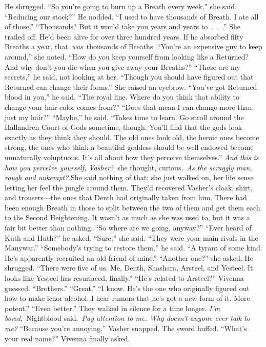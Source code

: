 He shrugged.
“So you’re going to burn up a Breath every week,” she said. “Reducing our stock?”
He nodded. “I used to have thousands of Breath. I ate all of those.”
“Thousands? But it would take you years and years to~.~.~.” She trailed off. He’d been alive for over three hundred years. If he absorbed fifty Breaths a year, that~\textit{was}~thousands of Breaths. “You’re an expensive guy to keep around,” she noted. “How do you keep yourself from looking like a Returned? And why don’t you die when you give away your Breaths?”
“Those are my secrets,” he said, not looking at her. “Though you should have figured out that Returned can change their forms.”
She raised an eyebrow.
“You’ve got Returned blood in you,” he said. “The royal line. Where do you think that ability to change your hair color comes from?”
“Does that mean I can change more than just my hair?”
“Maybe,” he said. “Takes time to learn. Go stroll around the Hallandren Court of Gods sometime, though. You’ll find that the gods look exactly as they think they should. The old ones look old, the heroic ones become strong, the ones who think a beautiful goddess should be well endowed become unnaturally voluptuous. It’s all about how they perceive themselves.”
\textit{And this is how you perceive yourself, Vasher?}~she thought, curious.~\textit{As the scraggly man, rough and unkempt?}
She said nothing of that; she just walked on, her life sense letting her feel the jungle around them. They’d recovered Vasher’s cloak, shirt, and trousers—the ones that Denth had originally taken from him. There had been enough Breath in those to split between the two of them and get them each to the Second Heightening. It wasn’t as much as she was used to, but it was a fair bit better than nothing.
“So where are we going, anyway?”
“Ever heard of Kuth and Huth?” he asked.
“Sure,” she said. “They were your main rivals in the Manywar.”
“Somebody’s trying to restore them,” he said. “A tyrant of some kind. He’s apparently recruited an old friend of mine.”
“Another one?” she asked.
He shrugged. “There were five of us. Me, Denth, Shashara, Arsteel, and Yesteel. It looks like Yesteel has resurfaced, finally.”
“He’s related to Arsteel?” Vivenna guessed.
“Brothers.”
“Great.”
“I know. He’s the one who originally figured out how to make ichor-alcohol. I hear rumors that he’s got a new form of it. More potent.”
“Even better.”
They walked in silence for a time longer.
\textit{I’m bored,}~Nightblood said.~\textit{Pay attention to me. Why doesn’t anyone ever talk to me?}
“Because you’re annoying,” Vasher snapped.
The sword huffed.
“What’s your real name?” Vivenna finally asked.
